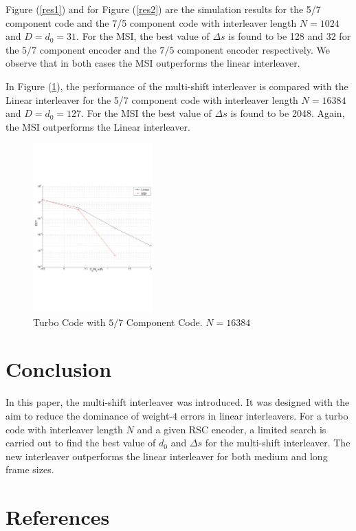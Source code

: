 \documentclass[technicalreport]{ieicej}
\begin{document}
 Figure (\ref{res1}) and for  Figure (\ref{res2}) are the simulation results for the 5/7 
 component code
 and the 7/5 component code with  interleaver length $N=1024$ and $D=d_0=31$. For
 the MSI, the best value of $\Delta s$ is found to be 128 and 32 for the
  $5/7$ component encoder and the
  $7/5$ component encoder respectively. We observe that in both cases
 the MSI outperforms the linear interleaver.
 
 In Figure (\ref{res3}), the performance of the multi-shift 
interleaver is compared with the Linear interleaver for the 
5/7 component code with interleaver length $N=16384$ and $D=d_0=127$. For the MSI
the best value of $\Delta s$ is found to be 2048. Again, the MSI outperforms the 
Linear interleaver. 

		\begin{figure}[h!]
\centering
		\includegraphics[height = 6.5cm,trim={0 7.2cm 0 6cm},clip]{msi_linear_16384.pdf}
		\caption{Turbo Code with $5/7$ Component Code. $N=16384$}
		\label{res3}
		\end{figure}
\section{Conclusion}
In this paper, the multi-shift interleaver was introduced. It was designed with the aim
to reduce the dominance of weight-$4 $ errors in linear interleavers. For a turbo code
with interleaver length $N$ and a given RSC encoder, a limited search is carried out to 
find the best value of $d_0$ and $\Delta s$ for the multi-shift interleaver. The new 
interleaver outperforms the linear interleaver for both medium and long frame sizes. 
\section{References}
\end{document}
